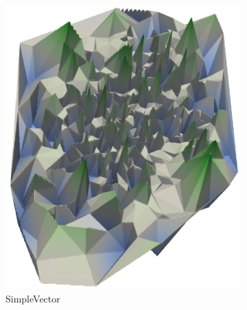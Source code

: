 \begin{figure}[t]
  \centering
	\begin{subfigure}[b]{0.43\textwidth}
    \includegraphics[width=\textwidth]{figures/coolidge-af-space-sim-vec.png}
		\caption{SimpleVector}
		\label{fig:lvars-bench-cores}
	\end{subfigure}
	~
	\begin{subfigure}[b]{0.43\textwidth}

\end{subfigure}
\end{figure}

